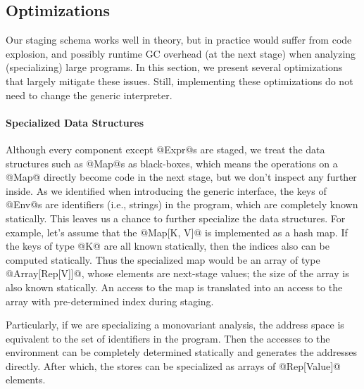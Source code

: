 \subsection{Optimizations} \label{staged_ds}

\iffalse
Revision: Solving Practical Challenges.
theoretically, all the things should work nicely. Unfolding the interpreter over the AST.
But the generated code is blowed up. For example .... This should not affect the correctness, 
but poses burden on the MSP system (ie LMS) and the next stage compiler/runtime (ie, scalac and JVM).
1) LMS becomes slower since a large IR graph is contructed during the staging.
2) Scalac becomes slower when reading a such large source code.
JVM has certain limitation on the size of a single method.

TODO: can we formulate selective caching as a partially-static data law.
TODO: lambda lifting for if
\fi

Our staging schema works well in theory, but in practice would suffer from code
explosion, and possibly runtime GC overhead (at the next stage) when analyzing
(specializing) large programs. In this section, we present several optimizations
that largely mitigate these issues. Still, implementing these optimizations do
not need to change the generic interpreter.

\paragraph{Specialized Data Structures}

Although every component except @Expr@s are staged, we treat the data
structures such as @Map@s as black-boxes, which means the operations on a @Map@
directly become code in the next stage, but we don't inspect any further inside.
As we identified when introducing the generic interface, the keys of @Env@s are
identifiers (i.e., strings) in the program, which are completely known
statically. This leaves us a chance to further specialize the data structures.
For example, let's assume that the @Map[K, V]@ is implemented as a hash map. If
the keys of type @K@ are all known statically, then the indices also can be
computed statically. Thus the specialized map would be an array of type
@Array[Rep[V]]@, whose elements are next-stage values; the size of the array is
also known statically. An access to the map is translated into an access to the
array with pre-determined index during staging.

Particularly, if we are specializing a monovariant analysis, the address space
is equivalent to the set of identifiers in the program. Then the accesses to the
environment can be completely determined statically and generates the addresses
directly. After which, the stores can be specialized as arrays of @Rep[Value]@
elements.

